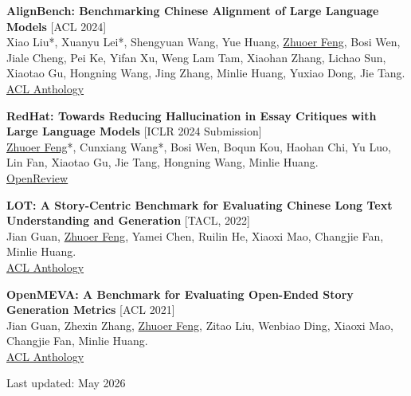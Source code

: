 \documentclass[11pt, a4paper]{article}
\begin{document}
\begin{enumerate}[leftmargin=1.5em, topsep=2pt, itemsep=6pt, parsep=0pt, label={[\arabic*]}]
    \item \textbf{AlignBench: Benchmarking Chinese Alignment of Large Language Models} \textcolor{accent}{[ACL 2024]} \\
    {\small Xiao Liu*, Xuanyu Lei*, Shengyuan Wang, Yue Huang, \underline{Zhuoer Feng}, Bosi Wen, Jiale Cheng, Pei Ke, Yifan Xu, Weng Lam Tam, Xiaohan Zhang, Lichao Sun, Xiaotao Gu, Hongning Wang, Jing Zhang, Minlie Huang, Yuxiao Dong, Jie Tang.} \\
    {\small \href{https://aclanthology.org/2024.acl-long.624/}{ACL Anthology}}

    \item \textbf{RedHat: Towards Reducing Hallucination in Essay Critiques with Large Language Models} \textcolor{accent}{[ICLR 2024 Submission]} \\
    {\small \underline{Zhuoer Feng}*, Cunxiang Wang*, Bosi Wen, Boqun Kou, Haohan Chi, Yu Luo, Lin Fan, Xiaotao Gu, Jie Tang, Hongning Wang, Minlie Huang.} \\
    {\small \href{https://openreview.net/forum?id=IULlNTZZel}{OpenReview}}


    \item \textbf{LOT: A Story-Centric Benchmark for Evaluating Chinese Long Text Understanding and Generation} \textcolor{accent}{[TACL, 2022]} \\
    {\small Jian Guan, \underline{Zhuoer Feng}, Yamei Chen, Ruilin He, Xiaoxi Mao, Changjie Fan, Minlie Huang.} \\
    {\small \href{https://aclanthology.org/2022.tacl-1.25.pdf}{ACL Anthology}}

    \item \textbf{OpenMEVA: A Benchmark for Evaluating Open-Ended Story Generation Metrics} \textcolor{accent}{[ACL 2021]} \\
    {\small Jian Guan, Zhexin Zhang, \underline{Zhuoer Feng}, Zitao Liu, Wenbiao Ding, Xiaoxi Mao, Changjie Fan, Minlie Huang.} \\
    {\small \href{https://aclanthology.org/2021.acl-long.500.pdf}{ACL Anthology}}

\end{enumerate}

\vspace{-0.8em}

\begin{center}
    {\small\color{lightgray} Last updated: May 2026}
\end{center}
\end{document}
